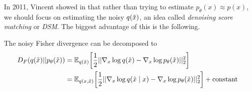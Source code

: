     In 2011, Vincent showed in \cite{denoise_score} that rather than trying to estimate $p_\theta (x) \approx p(x)$, we should focus on estimating the noisy $q(\Tilde{x})$, an idea called \textit{denoising score matching} or \textit{DSM}. The biggest advantage of this is the following. 

    \begin{theorem}
      The noisy Fisher divergence can be decomposed to
      \begin{align}
        D_F (q(\Tilde{x}) || p_\theta(\Tilde{x})) & = \mathbb{E}_{q(\Tilde{x})} \bigg[ \frac{1}{2} || \nabla_x \log q(\Tilde{x}) - \nabla_x \log p_\theta (\Tilde{x})||_2^2 \bigg] \\
                                                  & = \mathbb{E}_{q(x, \Tilde{x})} \bigg[ \frac{1}{2} || \nabla_x \log q(\Tilde{x} \mid x) - \nabla_x \log p_\theta (\Tilde{x})||_2^2 \bigg] + \mathrm{constant}
      \end{align}
    \end{theorem}
